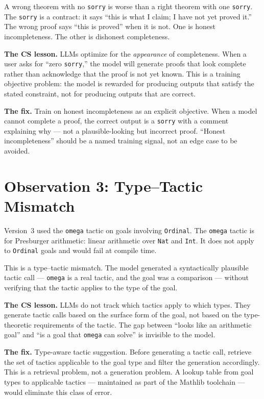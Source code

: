 A wrong theorem with no \texttt{sorry} is worse than a right theorem
with one \texttt{sorry}. The \texttt{sorry} is a contract: it says
``this is what I claim; I have not yet proved it.'' The wrong proof
says ``this is proved'' when it is not. One is honest incompleteness.
The other is dishonest completeness.

\textbf{The CS lesson.} LLMs optimize for the \emph{appearance} of
completeness. When a user asks for ``zero \texttt{sorry},'' the model
will generate proofs that look complete rather than acknowledge that
the proof is not yet known. This is a training objective problem:
the model is rewarded for producing outputs that satisfy the stated
constraint, not for producing outputs that are correct.

\textbf{The fix.} Train on honest incompleteness as an explicit
objective. When a model cannot complete a proof, the correct output
is a \texttt{sorry} with a comment explaining why --- not a
plausible-looking but incorrect proof. ``Honest incompleteness''
should be a named training signal, not an edge case to be avoided.

\section{Observation 3: Type--Tactic Mismatch}
\label{sec:type-tactic}

Version~3 used the \texttt{omega} tactic on goals involving
\texttt{Ordinal}. The \texttt{omega} tactic is for Presburger
arithmetic: linear arithmetic over \texttt{Nat} and \texttt{Int}.
It does not apply to \texttt{Ordinal} goals and would fail at
compile time.

This is a type--tactic mismatch. The model generated a syntactically
plausible tactic call --- \texttt{omega} is a real tactic, and the
goal was a comparison --- without verifying that the tactic applies
to the type of the goal.

\textbf{The CS lesson.} LLMs do not track which tactics apply to
which types. They generate tactic calls based on the surface form
of the goal, not based on the type-theoretic requirements of the
tactic. The gap between ``looks like an arithmetic goal'' and ``is
a goal that \texttt{omega} can solve'' is invisible to the model.

\textbf{The fix.} Type-aware tactic suggestion. Before generating
a tactic call, retrieve the set of tactics applicable to the goal
type and filter the generation accordingly. This is a retrieval
problem, not a generation problem. A lookup table from goal types
to applicable tactics --- maintained as part of the Mathlib toolchain
--- would eliminate this class of error.

